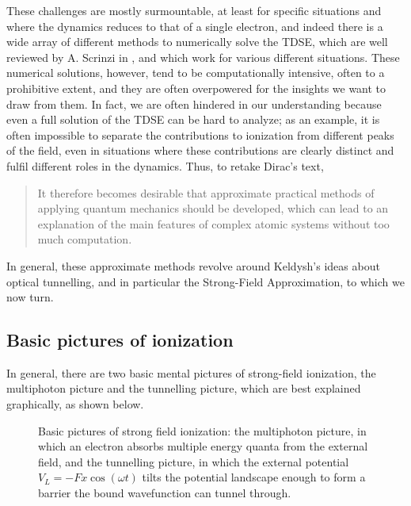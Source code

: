 These challenges are mostly surmountable, at least for specific situations and where the dynamics reduces to that of a single electron, and indeed there is a wide array of different methods to numerically solve the TDSE, which are well reviewed by A. Scrinzi in , and which work for various different situations. These numerical solutions, however, tend to be computationally intensive, often to a prohibitive extent, and they are often overpowered for the insights we want to draw from them. In fact, we are often hindered in our understanding because even a full solution of the TDSE can be hard to analyze; as an example, it is often impossible to separate the contributions to ionization from different peaks of the field, even in situations where these contributions are clearly distinct and fulfil different roles in the dynamics. Thus, to retake Dirac's text,
%
\begin{quote}
It therefore becomes desirable that approximate practical methods of applying quantum mechanics should be developed, which can lead to an explanation of the main features of complex atomic systems without too much computation.
\end{quote}
%
In general, these approximate methods revolve around Keldysh's ideas about optical tunnelling, and in particular the Strong-Field Approximation, to which we now turn.



\subsection{Basic pictures of ionization}
In general, there are two basic mental pictures of strong-field ionization, the multiphoton picture and the tunnelling picture, which are best explained graphically, as shown below.


\begin{figure}[h]
  \centering
  \hspace{3mm}
  \caption[Basic pictures of strong field ionization]{
  Basic pictures of strong field ionization: \protect{} the multiphoton picture, in which an electron absorbs multiple energy quanta from the external field, and \protect{} the tunnelling picture, in which the external potential $V_L = -Fx\cos(\omega t)$ tilts the potential landscape enough to form a barrier the bound wavefunction can tunnel through.
  }
\label{f1-basic-pictures}
\end{figure}

